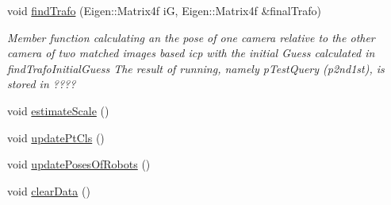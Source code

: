 \begin{DoxyCompactItemize}
void \hyperlink{classCentralStorage_aac60399a1652a2e63e3efd01d4758a1e}{find\-Trafo} (\-Eigen\-::\-Matrix4f i\-G, \-Eigen\-::\-Matrix4f \&final\-Trafo)
\begin{DoxyCompactList}\small\item\em \-Member function calculating an the pose of one camera relative to the other camera of two matched images based icp with the initial \-Guess calculated in find\-Trafo\-Initial\-Guess \-The result of running, namely p\-Test\-Query (p2nd1st), is stored in ???? \end{DoxyCompactList}\item 
void \hyperlink{classCentralStorage_a250829100ab52dc84a71997246870a69}{estimate\-Scale} ()
\item 
void \hyperlink{classCentralStorage_ac065c164a68a24bb1d5e0ff0b9a41f84}{update\-Pt\-Cls} ()
\item 
void \hyperlink{classCentralStorage_ad0e2f8a4581fe0e61a49b07141442dd2}{update\-Poses\-Of\-Robots} ()
\item 
void \hyperlink{classCentralStorage_a90df91c64ab74dfa7d557f08a27a9cdf}{clear\-Data} ()
\end{DoxyCompactItemize}
